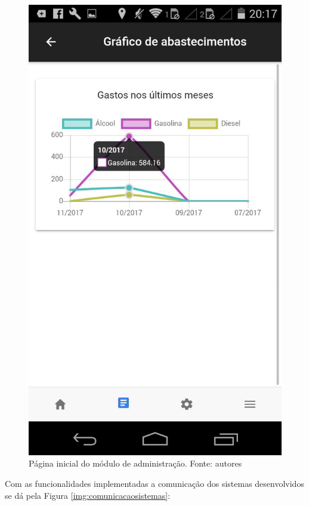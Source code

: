 \begin{figure}[H]
    \centering
    \includegraphics[scale=0.2]{figuras/grafico-app.jpg}
    \caption[Página inicial do módulo de administração]{Página inicial do módulo de administração. Fonte: autores}
    \label{img:grafico-app}
\end{figure}

Com as funcionalidades implementadas a comunicação dos sistemas desenvolvidos se dá pela Figura \ref{img:comunicacaosistemas}:

